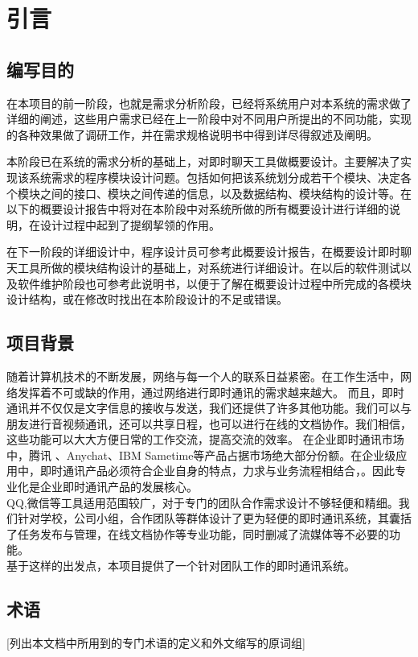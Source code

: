 \chapter{引言}

\section{编写目的}
在本项目的前一阶段，也就是需求分析阶段，已经将系统用户对本系统的需求做了详细的阐述，这些用户需求已经在上一阶段中对不同用户所提出的不同功能，实现的各种效果做了调研工作，并在需求规格说明书中得到详尽得叙述及阐明。

本阶段已在系统的需求分析的基础上，对即时聊天工具做概要设计。主要解决了实现该系统需求的程序模块设计问题。包括如何把该系统划分成若干个模块、决定各个模块之间的接口、模块之间传递的信息，以及数据结构、模块结构的设计等。在以下的概要设计报告中将对在本阶段中对系统所做的所有概要设计进行详细的说明，在设计过程中起到了提纲挈领的作用。

在下一阶段的详细设计中，程序设计员可参考此概要设计报告，在概要设计即时聊天工具所做的模块结构设计的基础上，对系统进行详细设计。在以后的软件测试以及软件维护阶段也可参考此说明书，以便于了解在概要设计过程中所完成的各模块设计结构，或在修改时找出在本阶段设计的不足或错误。


\section{项目背景}

随着计算机技术的不断发展，网络与每一个人的联系日益紧密。在工作生活中，网络发挥着不可或缺的作用，通过网络进行即时通讯的需求越来越大。
而且，即时通讯并不仅仅是文字信息的接收与发送，我们还提供了许多其他功能。我们可以与朋友进行音视频通讯，还可以共享日程，也可以进行在线的文档协作。我们相信，这些功能可以大大方便日常的工作交流，提高交流的效率。
在企业即时通讯市场中，腾讯 、Anychat、IBM Sametime等产品占据市场绝大部分份额。在企业级应用中，即时通讯产品必须符合企业自身的特点，力求与业务流程相结合，。因此专业化是企业即时通讯产品的发展核心。\\ QQ,微信等工具适用范围较广，对于专门的团队合作需求设计不够轻便和精细。我们针对学校，公司小组，合作团队等群体设计了更为轻便的即时通讯系统，其囊括了任务发布与管理，在线文档协作等专业功能，同时删减了流媒体等不必要的功能。\\
基于这样的出发点，本项目提供了一个针对团队工作的即时通讯系统。

\section{术语}
[列出本文档中所用到的专门术语的定义和外文缩写的原词组]

